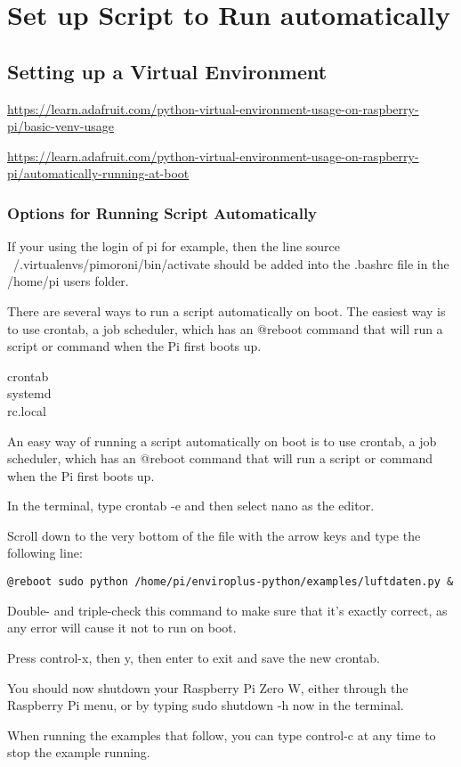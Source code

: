 \documentclass{article}
\begin{document}
\section{Set up Script to Run automatically}

\subsection{Setting up a Virtual Environment}

\url{https://learn.adafruit.com/python-virtual-environment-usage-on-raspberry-pi/basic-venv-usage}

\url{https://learn.adafruit.com/python-virtual-environment-usage-on-raspberry-pi/automatically-running-at-boot}

\subsubsection{Options for Running Script Automatically}

If your using the login of pi for example, then the line source ~/.virtualenvs/pimoroni/bin/activate should be added into the .bashrc file in the /home/pi users folder.

There are several ways to run a script automatically on boot. The easiest way is to use crontab, a job scheduler, which has an @reboot command that will run a script or command when the Pi first boots up.

\begin{description}
\item[crontab]
\item[systemd]
\item[rc.local]
\end{description}









An easy way of running a script automatically on boot is to use crontab, a job scheduler, which has an @reboot command that will run a script or command when the Pi first boots up.

In the terminal, type crontab -e and then select nano as the editor.

Scroll down to the very bottom of the file with the arrow keys and type the following line:
\begin{verbatim}
@reboot sudo python /home/pi/enviroplus-python/examples/luftdaten.py &
\end{verbatim}

Double- and triple-check this command to make sure that it's exactly correct, as any error will cause it not to run on boot.

Press control-x, then y, then enter to exit and save the new crontab.

You should now shutdown your Raspberry Pi Zero W, either through the Raspberry Pi menu, or by typing sudo shutdown -h now in the terminal.


When running the examples that follow, you can type control-c at any time to stop the example running.
\end{document}
